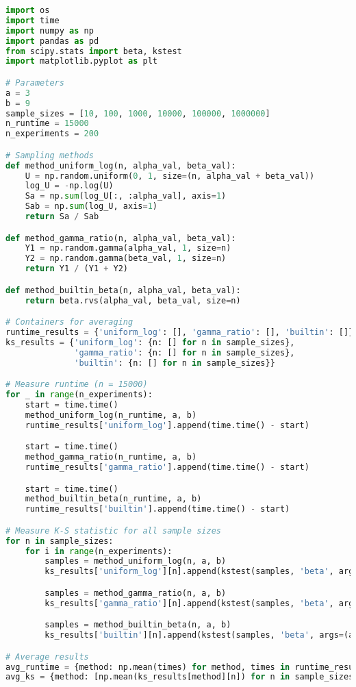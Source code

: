 \begin{lstlisting}[language=Python]
import os
import time
import numpy as np
import pandas as pd
from scipy.stats import beta, kstest
import matplotlib.pyplot as plt

# Parameters
a = 3
b = 9
sample_sizes = [10, 100, 1000, 10000, 100000, 1000000]
n_runtime = 15000
n_experiments = 200

# Sampling methods
def method_uniform_log(n, alpha_val, beta_val):
    U = np.random.uniform(0, 1, size=(n, alpha_val + beta_val))
    log_U = -np.log(U)
    Sa = np.sum(log_U[:, :alpha_val], axis=1)
    Sab = np.sum(log_U, axis=1)
    return Sa / Sab

def method_gamma_ratio(n, alpha_val, beta_val):
    Y1 = np.random.gamma(alpha_val, 1, size=n)
    Y2 = np.random.gamma(beta_val, 1, size=n)
    return Y1 / (Y1 + Y2)

def method_builtin_beta(n, alpha_val, beta_val):
    return beta.rvs(alpha_val, beta_val, size=n)

# Containers for averaging
runtime_results = {'uniform_log': [], 'gamma_ratio': [], 'builtin': []}
ks_results = {'uniform_log': {n: [] for n in sample_sizes},
              'gamma_ratio': {n: [] for n in sample_sizes},
              'builtin': {n: [] for n in sample_sizes}}

# Measure runtime (n = 15000)
for _ in range(n_experiments):
    start = time.time()
    method_uniform_log(n_runtime, a, b)
    runtime_results['uniform_log'].append(time.time() - start)

    start = time.time()
    method_gamma_ratio(n_runtime, a, b)
    runtime_results['gamma_ratio'].append(time.time() - start)

    start = time.time()
    method_builtin_beta(n_runtime, a, b)
    runtime_results['builtin'].append(time.time() - start)

# Measure K-S statistic for all sample sizes
for n in sample_sizes:
    for i in range(n_experiments):
        samples = method_uniform_log(n, a, b)
        ks_results['uniform_log'][n].append(kstest(samples, 'beta', args=(a, b))[0])

        samples = method_gamma_ratio(n, a, b)
        ks_results['gamma_ratio'][n].append(kstest(samples, 'beta', args=(a, b))[0])

        samples = method_builtin_beta(n, a, b)
        ks_results['builtin'][n].append(kstest(samples, 'beta', args=(a, b))[0])

# Average results
avg_runtime = {method: np.mean(times) for method, times in runtime_results.items()}
avg_ks = {method: [np.mean(ks_results[method][n]) for n in sample_sizes] for method in ks_results.keys()}


\end{lstlisting}
